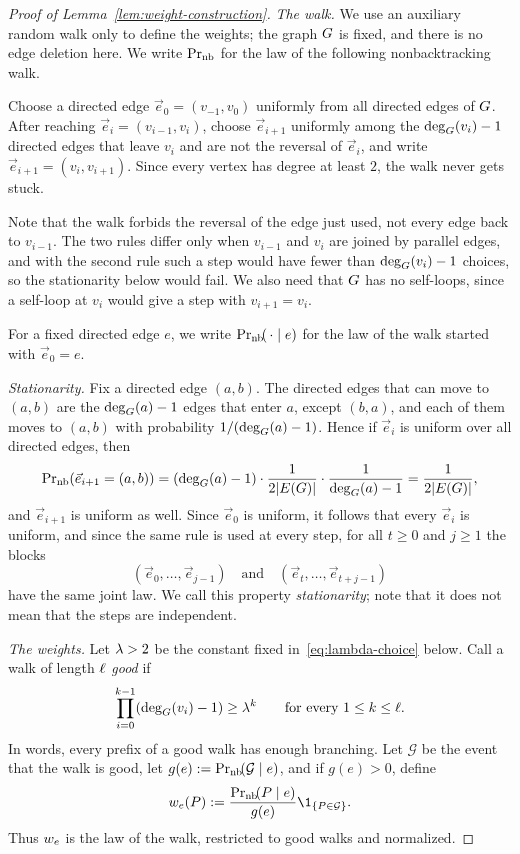 \begin{proof}[Proof of Lemma~\ref{lem:weight-construction}]
\emph{The walk.} We use an auxiliary random walk only to define the weights;
the graph \(G\) is fixed, and there is no edge deletion here. We write
\(\operatorname{Pr}_{\mathrm{nb}}\) for the law of the following nonbacktracking walk.

Choose a directed edge \(\vec e_0=(v_{-1},v_0)\) uniformly from all directed
edges of \(G\). After reaching \(\vec e_i=(v_{i-1},v_i)\), choose
\(\vec e_{i+1}\) uniformly among the \(\deg_{G}(v_i)-1\) directed edges that
leave \(v_i\) and are not the reversal of \(\vec e_i\), and write
\(\vec e_{i+1}=(v_i,v_{i+1})\). Since every vertex has degree at least \(2\),
the walk never gets stuck.

Note that the walk forbids the reversal of the edge just used, not every edge
back to \(v_{i-1}\). The two rules differ only when \(v_{i-1}\) and \(v_i\) are
joined by parallel edges, and with the second rule such a step would have
fewer than \(\deg_{G}(v_i)-1\) choices, so the stationarity below would fail.
We also need that \(G\) has no self-loops, since a self-loop at \(v_i\)
would give a step with \(v_{i+1}=v_i\).

For a fixed directed edge \(e\), we write \(\Prx[\mathrm{nb}]{\,\cdot\mid e}\)
for the law of the walk started with \(\vec e_0=e\).

\emph{Stationarity.} Fix a directed edge \((a,b)\). The directed edges that can
move to \((a,b)\) are the \(\deg_{G}(a)-1\) edges that enter \(a\), except
\((b,a)\), and each of them moves to \((a,b)\) with probability
\(1/(\deg_{G}(a)-1)\). Hence if \(\vec e_i\) is uniform over all directed
edges, then
\[
  \Prx[\mathrm{nb}]{\vec e_{i+1}=(a,b)}
  =(\dg{\Gin}{a}-1)\cdot\frac{1}{2|E(\Gin)|}\cdot\frac{1}{\dg{\Gin}{a}-1}
  =\frac{1}{2|E(\Gin)|},
\]
and \(\vec e_{i+1}\) is uniform as well. Since \(\vec e_0\) is uniform, it
follows that every \(\vec e_i\) is uniform, and since the same rule is used at
every step, for all \(t\ge0\) and \(j\ge1\) the blocks
\[
  (\vec e_0,\ldots,\vec e_{j-1})
  \quad\text{and}\quad
  (\vec e_t,\ldots,\vec e_{t+j-1})
\]
have the same joint law. We call this property \emph{stationarity}; note that
it does not mean that the steps are independent.

\emph{The weights.} Let \(\lambda>2\) be the constant fixed
in~\eqref{eq:lambda-choice} below. Call a walk of length \(\ell\) \emph{good}
if
\begin{equation}\label{eq:path-prefix-growth}
  \prod_{i=0}^{k-1}(\deg_{G}(v_i)-1)\ge\lambda^k
  \qquad\text{for every }1\le k\le \ell.
\end{equation}
In words, every prefix of a good walk has enough branching. Let \(\mathcal G\)
be the event that the walk is good, let
\(g(e):=\Prx[\mathrm{nb}]{\mathcal G\mid e}\), and if \(g(e)>0\), define
\[
  \wt{e}(P):=
  \frac{\Prx[\mathrm{nb}]{P\mid e}}{g(e)}
  \1_{\{P\in\mathcal G\}}.
\]
Thus \(w_{e}\) is the law of the walk, restricted to good walks and
normalized.


\end{proof}
